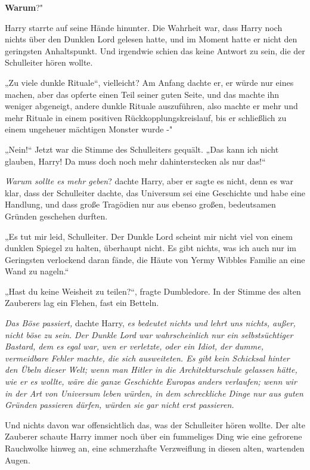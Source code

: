 {\textbf{Warum}?"

Harry starrte auf seine Hände hinunter. Die Wahrheit war, dass Harry noch nichts über den Dunklen Lord gelesen hatte, und im Moment hatte er nicht den geringsten Anhaltspunkt. Und irgendwie schien das keine Antwort zu sein, die der Schulleiter hören wollte.

„Zu viele dunkle Rituale“, vielleicht? Am Anfang dachte er, er würde nur eines machen, aber das opferte einen Teil seiner guten Seite, und das machte ihn weniger abgeneigt, andere dunkle Rituale auszuführen, also machte er mehr und mehr Rituale in einem positiven Rückkopplungskreislauf, bis er schließlich zu einem ungeheuer mächtigen Monster wurde -"

„Nein!“ Jetzt war die Stimme des Schulleiters gequält. „Das kann ich nicht glauben, Harry! Da muss doch noch mehr dahinterstecken als nur das!“

\emph{Warum sollte es mehr geben}? dachte Harry, aber er sagte es nicht, denn es war klar, dass der Schulleiter dachte, das Universum sei eine Geschichte und habe eine Handlung, und dass große Tragödien nur aus ebenso großen, bedeutsamen Gründen geschehen durften.

„Es tut mir leid, Schulleiter. Der Dunkle Lord scheint mir nicht viel von einem dunklen Spiegel zu halten, überhaupt nicht. Es gibt nichts, was ich auch nur im Geringsten verlockend daran fände, die Häute von Yermy Wibbles Familie an eine Wand zu nageln.“

„Hast du keine Weisheit zu teilen?“, fragte Dumbledore. In der Stimme des alten Zauberers lag ein Flehen, fast ein Betteln.

\emph{Das Böse passiert,} dachte Harry, \emph{es bedeutet nichts und lehrt uns nichts, außer, nicht böse zu sein.} \emph{Der Dunkle Lord war wahrscheinlich nur ein selbstsüchtiger Bastard, dem es egal war, wen er verletzte, oder ein Idiot, der dumme, vermeidbare Fehler machte, die sich ausweiteten. Es gibt kein Schicksal hinter den Übeln dieser Welt; wenn man Hitler in die Architekturschule gelassen hätte, wie er es wollte, wäre die ganze Geschichte Europas anders verlaufen; wenn wir in der Art von Universum leben würden, in dem schreckliche Dinge nur aus guten Gründen passieren dürfen, würden sie gar nicht erst passieren.}

Und nichts davon war offensichtlich das, was der Schulleiter hören wollte. Der alte Zauberer schaute Harry immer noch über ein fummeliges Ding wie eine gefrorene Rauchwolke hinweg an, eine schmerzhafte Verzweiflung in diesen alten, wartenden Augen.

}
